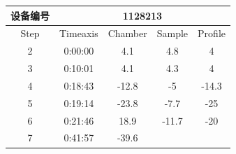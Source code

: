 \documentclass[UTF8,10pt,a4paper,fontset=fandol]{ctexart}
\newcommand{\fieldvalue}[1]{#1}
\begin{document}
\begin{tabularx}{0.55\textwidth}{|c|c|c|c|c|}
\hline
设备编号 & \multicolumn{4}{c|}{%
\fieldvalue{1128213}} \\
\hline
Step & Timeaxis & Chamber & Sample & Profile \\
\hline
\fieldvalue{2} &
\fieldvalue{0:00:00} &
\fieldvalue{4.1} &
\fieldvalue{4.8} &
\fieldvalue{4} \\
\hline
\fieldvalue{3} &
\fieldvalue{0:10:01} &
\fieldvalue{4.1} &
\fieldvalue{4.3} &
\fieldvalue{4} \\
\hline
\fieldvalue{4} &
\fieldvalue{0:18:43} &
\fieldvalue{-12.8} &
\fieldvalue{-5} &
\fieldvalue{-14.3} \\
\hline
\fieldvalue{5} &
\fieldvalue{0:19:14} &
\fieldvalue{-23.8} &
\fieldvalue{-7.7} &
\fieldvalue{-25} \\
\hline
\fieldvalue{6} &
\fieldvalue{0:21:46} &
\fieldvalue{18.9} &
\fieldvalue{-11.7} &
\fieldvalue{-20} \\
\hline
\fieldvalue{7} &
\fieldvalue{0:41:57} &
\fieldvalue{-39.6} &

\end{tabularx}
\end{document}
